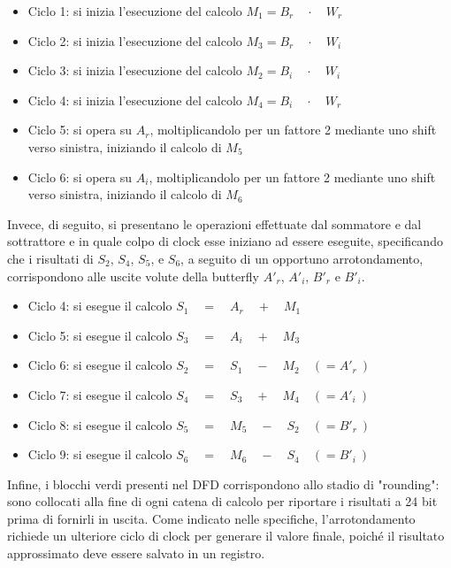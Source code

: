 \begin{itemize}
    \item Ciclo 1: si inizia l'esecuzione del calcolo $M_1 = B_{r} \quad \cdot \quad W_{r}$
    \item Ciclo 2: si inizia l'esecuzione del calcolo $M_3 = B_{r} \quad \cdot \quad W_{i}$
    \item Ciclo 3: si inizia l'esecuzione del calcolo $M_2 = B_{i} \quad \cdot \quad W_{i}$
    \item Ciclo 4: si inizia l'esecuzione del calcolo $M_4 = B_{i} \quad \cdot \quad W_{r}$
    \item Ciclo 5: si opera su $A_{r}$, moltiplicandolo per un fattore 2 mediante uno shift verso sinistra, iniziando il calcolo di $M_5$
    \item Ciclo 6: si opera su $A_{i}$, moltiplicandolo per un fattore 2 mediante uno shift verso sinistra, iniziando il calcolo di $M_6$
\end{itemize}
Invece, di seguito, si presentano le operazioni effettuate dal sommatore e dal sottrattore e in quale colpo di clock esse iniziano ad essere eseguite, specificando che i risultati di $S_2$, $S_4$, $S_5$, e $S_6$, a seguito di un opportuno arrotondamento, corrispondono alle uscite volute della butterfly $A'_r$, $A'_i$, $B'_r$ e $B'_i$.
\begin{itemize}
    \item Ciclo 4: si esegue il calcolo $S_{1} \quad = \quad A_{r} \quad + \quad M_1$
    \item Ciclo 5: si esegue il calcolo $S_{3} \quad = \quad A_{i} \quad + \quad M_3$
    \item Ciclo 6: si esegue il calcolo $S_{2} \quad = \quad S_{1}\quad - \quad M_2  \quad (= A'_{r}\ )$
    \item Ciclo 7: si esegue il calcolo $S_{4} \quad = \quad S_{3} \quad + \quad M_4  \quad (= A'_{i}\ )$
    \item Ciclo 8: si esegue il calcolo $S_{5}\quad = \quad M_5 \quad - \quad S_{2}  \quad (= B'_{r}\ )$
    \item Ciclo 9: si esegue il calcolo $S_{6}\quad = \quad M_6 \quad - \quad S_{4}  \quad (= B'_{i}\ )$
\end{itemize}
 
\noindent Infine, i blocchi verdi presenti nel DFD corrispondono allo stadio di "rounding": sono collocati alla fine di ogni catena di calcolo per riportare i risultati a 24 bit prima di fornirli in uscita. Come indicato nelle specifiche, l'arrotondamento richiede un ulteriore ciclo di clock per generare il valore finale, poiché il risultato approssimato deve essere salvato in un registro.

